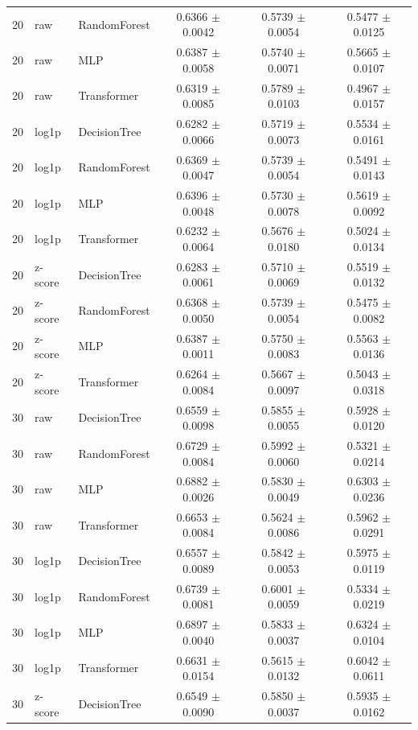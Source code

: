 \begin{longtable}{rllccc}
20 & raw & RandomForest & 0.6366 $\pm$ 0.0042 & 0.5739 $\pm$ 0.0054 & 0.5477 $\pm$ 0.0125 \\
20 & raw & MLP & 0.6387 $\pm$ 0.0058 & 0.5740 $\pm$ 0.0071 & 0.5665 $\pm$ 0.0107 \\
20 & raw & Transformer & 0.6319 $\pm$ 0.0085 & 0.5789 $\pm$ 0.0103 & 0.4967 $\pm$ 0.0157 \\
20 & log1p & DecisionTree & 0.6282 $\pm$ 0.0066 & 0.5719 $\pm$ 0.0073 & 0.5534 $\pm$ 0.0161 \\
20 & log1p & RandomForest & 0.6369 $\pm$ 0.0047 & 0.5739 $\pm$ 0.0054 & 0.5491 $\pm$ 0.0143 \\
20 & log1p & MLP & 0.6396 $\pm$ 0.0048 & 0.5730 $\pm$ 0.0078 & 0.5619 $\pm$ 0.0092 \\
20 & log1p & Transformer & 0.6232 $\pm$ 0.0064 & 0.5676 $\pm$ 0.0180 & 0.5024 $\pm$ 0.0134 \\
20 & z-score & DecisionTree & 0.6283 $\pm$ 0.0061 & 0.5710 $\pm$ 0.0069 & 0.5519 $\pm$ 0.0132 \\
20 & z-score & RandomForest & 0.6368 $\pm$ 0.0050 & 0.5739 $\pm$ 0.0054 & 0.5475 $\pm$ 0.0082 \\
20 & z-score & MLP & 0.6387 $\pm$ 0.0011 & 0.5750 $\pm$ 0.0083 & 0.5563 $\pm$ 0.0136 \\
20 & z-score & Transformer & 0.6264 $\pm$ 0.0084 & 0.5667 $\pm$ 0.0097 & 0.5043 $\pm$ 0.0318 \\
30 & raw & DecisionTree & 0.6559 $\pm$ 0.0098 & 0.5855 $\pm$ 0.0055 & 0.5928 $\pm$ 0.0120 \\
30 & raw & RandomForest & 0.6729 $\pm$ 0.0084 & 0.5992 $\pm$ 0.0060 & 0.5321 $\pm$ 0.0214 \\
30 & raw & MLP & 0.6882 $\pm$ 0.0026 & 0.5830 $\pm$ 0.0049 & 0.6303 $\pm$ 0.0236 \\
30 & raw & Transformer & 0.6653 $\pm$ 0.0084 & 0.5624 $\pm$ 0.0086 & 0.5962 $\pm$ 0.0291 \\
30 & log1p & DecisionTree & 0.6557 $\pm$ 0.0089 & 0.5842 $\pm$ 0.0053 & 0.5975 $\pm$ 0.0119 \\
30 & log1p & RandomForest & 0.6739 $\pm$ 0.0081 & 0.6001 $\pm$ 0.0059 & 0.5334 $\pm$ 0.0219 \\
30 & log1p & MLP & 0.6897 $\pm$ 0.0040 & 0.5833 $\pm$ 0.0037 & 0.6324 $\pm$ 0.0104 \\
30 & log1p & Transformer & 0.6631 $\pm$ 0.0154 & 0.5615 $\pm$ 0.0132 & 0.6042 $\pm$ 0.0611 \\
30 & z-score & DecisionTree & 0.6549 $\pm$ 0.0090 & 0.5850 $\pm$ 0.0037 & 0.5935 $\pm$ 0.0162 \\

\end{longtable}
